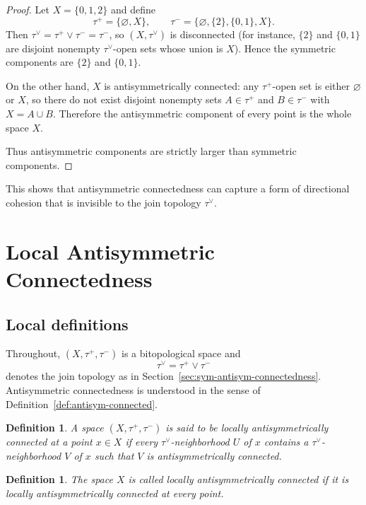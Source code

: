 \documentclass[preprint,12pt]{elsarticle}
\newtheorem{definition}[theorem]{Definition}
\begin{document}
\begin{proof}
Let $X=\{0,1,2\}$ and define
\[
\tau^{+}=\{\varnothing,X\},
\qquad
\tau^{-}=\{\varnothing,\{2\},\{0,1\},X\}.
\]
Then $\tau^\vee=\tau^{+}\vee\tau^{-}=\tau^{-}$, so $(X,\tau^\vee)$ is
disconnected (for instance, $\{2\}$ and $\{0,1\}$ are disjoint nonempty
$\tau^\vee$-open sets whose union is $X$). Hence the symmetric components
are $\{2\}$ and $\{0,1\}$.

On the other hand, $X$ is antisymmetrically connected: any $\tau^{+}$-open
set is either $\varnothing$ or $X$, so there do not exist disjoint nonempty
sets $A\in\tau^{+}$ and $B\in\tau^{-}$ with $X=A\cup B$. Therefore the
antisymmetric component of every point is the whole space $X$.

Thus antisymmetric components are strictly larger than symmetric components.
\end{proof}

\noindent
This shows that antisymmetric connectedness can capture a form of
directional cohesion that is invisible to the join topology
$\tau^\vee$.


\section{Local Antisymmetric Connectedness}
\label{sec:local-antisym-connectedness}

\subsection{Local definitions}
\label{ssec:local-definitions}

Throughout, $(X,\tau^{+},\tau^{-})$ is a bitopological space and
\[
\tau^\vee=\tau^{+}\vee\tau^{-}
\]
denotes the join topology as in Section~\ref{sec:sym-antisym-connectedness}.
Antisymmetric connectedness is understood in the sense of
Definition~\ref{def:antisym-connected}.

\begin{definition}
\label{def:local-antisym-point}
A space $(X,\tau^{+},\tau^{-})$ is said to be \emph{locally
antisymmetrically connected at a point $x\in X$} if every
$\tau^\vee$-neighborhood $U$ of $x$ contains a $\tau^\vee$-neighborhood
$V$ of $x$ such that $V$ is antisymmetrically connected.
\end{definition}

\begin{definition}
\label{def:locally-antisym}
The space $X$ is called \emph{locally antisymmetrically connected} if it
is locally antisymmetrically connected at every point.
\end{definition}
\end{document}
